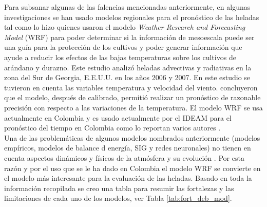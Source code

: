 Para subsanar algunas de las falencias mencionadas anteriormente, en algunas investigaciones se han usado modelos regionales para el pronóstico de las heladas tal como lo hizo \citet{prabha2008evaluation} quienes usaron el modelo \textit{Weather Research and Forecasting Model} (WRF) para poder determinar  si la información de mesoescala puede ser una guía para la protección de los cultivos y poder generar información que ayude a reducir los efectos de las bajas temperaturas sobre los cultivos de arándano y durazno. Este estudio analizó heladas advectivas y radiativas en la zona del Sur de Georgia, E.E.U.U. en los años 2006 y 2007. En este estudio se tuvieron en cuenta las variables temperatura y velocidad del viento. \citet{prabha2008evaluation} concluyeron que el modelo, después de calibrado, permitió realizar un pronóstico de razonable precisión con respecto a las variaciones de la temperatura. El modelo WRF se usa actualmente en Colombia y es usado actualmente por el IDEAM para el pronóstico del tiempo en Colombia como lo reportan varios autores \citep{Arango2011, Mejia2012, Ruiz2014}.\\



Una de las problemáticas de algunos modelos nombrados anteriormente (modelos empíricos, modelos de balance d energía, SIG  y redes neuronales) no tienen en cuenta aspectos dinámicos y físicos de la atmósfera y su evolución \citep{Prabha2008a}. Por esta razón y por el uso que se le ha dado en Colombia el modelo WRF se convierte en el modelo más interesante para la evaluación de las heladas. Basado en toda la información recopilada se creo una tabla para resumir las fortalezas y las limitaciones de cada uno de los modelos, ver Tabla \ref{tab:fort_deb_mod}.



